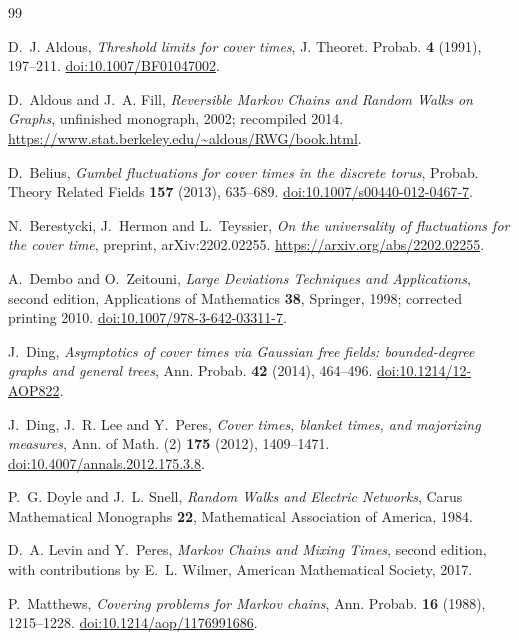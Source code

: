 \documentclass[11pt]{amsart}
\theoremstyle{remark}
\numberwithin{equation}{section}
\begin{document}
\begin{thebibliography}{99}

D.~J. Aldous, \emph{Threshold limits for cover times}, J. Theoret. Probab. \textbf{4} (1991), 197--211.
\href{https://doi.org/10.1007/BF01047002}{doi:10.1007/BF01047002}.

D.~Aldous and J.~A. Fill, \emph{Reversible Markov Chains and Random Walks on Graphs}, unfinished monograph, 2002; recompiled 2014.
\url{https://www.stat.berkeley.edu/~aldous/RWG/book.html}.

D.~Belius, \emph{Gumbel fluctuations for cover times in the discrete torus}, Probab. Theory Related Fields \textbf{157} (2013), 635--689.
\href{https://doi.org/10.1007/s00440-012-0467-7}{doi:10.1007/s00440-012-0467-7}.

N.~Berestycki, J.~Hermon and L.~Teyssier, \emph{On the universality of fluctuations for the cover time}, preprint, arXiv:2202.02255.
\url{https://arxiv.org/abs/2202.02255}.

A.~Dembo and O.~Zeitouni, \emph{Large Deviations Techniques and Applications}, second edition, Applications of Mathematics \textbf{38}, Springer, 1998; corrected printing 2010.
\href{https://doi.org/10.1007/978-3-642-03311-7}{doi:10.1007/978-3-642-03311-7}.

J.~Ding, \emph{Asymptotics of cover times via Gaussian free fields: bounded-degree graphs and general trees}, Ann. Probab. \textbf{42} (2014), 464--496.
\href{https://doi.org/10.1214/12-AOP822}{doi:10.1214/12-AOP822}.

J.~Ding, J.~R. Lee and Y.~Peres, \emph{Cover times, blanket times, and majorizing measures}, Ann. of Math. (2) \textbf{175} (2012), 1409--1471.
\href{https://doi.org/10.4007/annals.2012.175.3.8}{doi:10.4007/annals.2012.175.3.8}.

P.~G. Doyle and J.~L. Snell, \emph{Random Walks and Electric Networks}, Carus Mathematical Monographs \textbf{22}, Mathematical Association of America, 1984.

D.~A. Levin and Y.~Peres, \emph{Markov Chains and Mixing Times}, second edition, with contributions by E.~L. Wilmer, American Mathematical Society, 2017.

P.~Matthews, \emph{Covering problems for Markov chains}, Ann. Probab. \textbf{16} (1988), 1215--1228.
\href{https://doi.org/10.1214/aop/1176991686}{doi:10.1214/aop/1176991686}.


\end{thebibliography}
\end{document}
